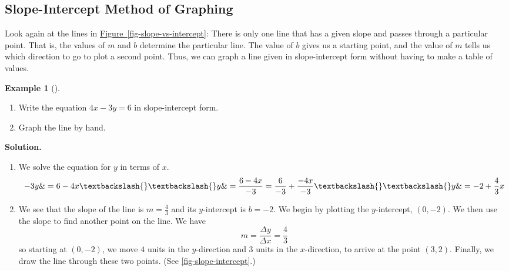 \documentclass[10pt,]{book}
\theoremstyle{plain}
\theoremstyle{definition}
\theoremstyle{definition}
\newtheorem{example}[theorem]{Example}
\theoremstyle{definition}
\theoremstyle{definition}
\numberwithin{equation}{part}
\begin{document}
\subsection[{Slope-Intercept Method of Graphing}]{Slope-Intercept Method of Graphing}\label{subsection-29}
Look again at the lines in \hyperref[fig-slope-vs-intercept]{Figure~\ref{fig-slope-vs-intercept}}: There is only one line that has a given slope and passes through a particular point. That is, the values of \(m\) and \(b\) determine the particular line. The value of \(b\) gives us a starting point, and the value of \(m\) tells us which direction to go to plot a second point. Thus, we can graph a line given in slope-intercept form without having to make a table of values.%
\begin{example}[]\label{example-slope-intercept}
\leavevmode%
\begin{enumerate}[label=*\alph**]
\item\hypertarget{li-1106}{}Write the equation \(4x - 3y = 6\) in slope-intercept form.%
\item\hypertarget{li-1107}{}Graph the line by hand.%
\end{enumerate}
%
\par\medskip\noindent%
\textbf{Solution.}\quad \leavevmode%
\begin{enumerate}[label=*\alph**]
\item\hypertarget{li-1108}{}We solve the equation for \(y\) in terms of \(x\). \begin{align*} -3y \&=6 - 4x\textbackslash{}\textbackslash{} y \&= \frac{6 - 4x}{-3} =\frac{6}{-3}+\frac{-4x}{-3}\textbackslash{}\textbackslash{} y \&= -2+\frac{4}{3}x \end{align*}%
\item\hypertarget{li-1109}{}We see that the slope of the line is \(m = \frac{4}{3}\) and its \(y\)-intercept is \(b = -2\). We begin by plotting the \(y\)-intercept, \((0, -2)\). We then use the slope to find another point on the line. We have%
\begin{equation*}
m = \frac{\Delta y}{\Delta x}=\frac{4}{3}
\end{equation*}
so starting at \((0, -2)\), we move \(4\) units in the \(y\)-direction and \(3\) units in the \(x\)-direction, to arrive at the point \((3, 2)\). Finally, we draw the line through these two points. (See \hyperref[fig-slope-intercept]{\ref{fig-slope-intercept}}.)%
\end{enumerate}
 \begin{figure}
\centering

\end{figure}
\end{example}
\end{document}
